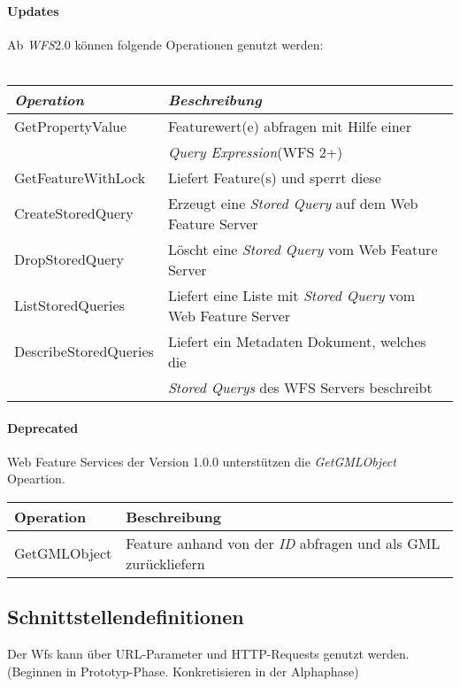 \paragraph*{Updates}\label{differences}
Ab \emph{WFS}2.0 können folgende Operationen genutzt werden:\\
\vspace{1em}\\
\begin{tabular}{ll}
\emph{Operation} & \emph{Beschreibung} \\
\hline 
GetPropertyValue	 & Featurewert(e) abfragen mit Hilfe einer \\&\emph{Query Expression}(WFS 2+)\\
\hline 
GetFeatureWithLock & Liefert Feature(s) und sperrt diese\\
\hline 
CreateStoredQuery	& Erzeugt eine \emph{Stored Query} auf dem Web Feature Server\\
\hline 
DropStoredQuery	& Löscht eine \emph{Stored Query} vom Web Feature Server\\
\hline 
ListStoredQueries&	Liefert eine Liste mit \emph{Stored Query} vom Web Feature Server\\
\hline 
DescribeStoredQueries	& Liefert ein Metadaten Dokument, welches die \\ & \emph{Stored Querys} des WFS Servers beschreibt\\
\hline 
\end{tabular}
\paragraph*{Deprecated} Web Feature Services der Version 1.0.0 unterstützen die \emph{GetGMLObject} Opeartion.
\\

\begin{tabular}{ll}
Operation & Beschreibung\\
\hline
GetGMLObject & Feature anhand von der \emph{ID} abfragen und als GML zurückliefern
\end{tabular}



\subsection*{Schnittstellendefinitionen}
Der Wfs kann \"uber URL-Parameter und HTTP-Requests genutzt werden.\\

(Beginnen in Prototyp-Phase. Konkretisieren in der Alphaphase)

